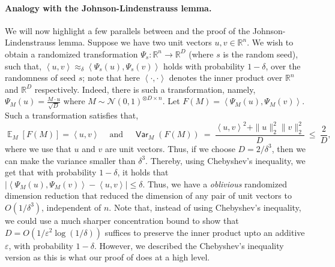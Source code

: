 \documentclass[11pt]{article}
\newcommand{\inparen}[1]{\left ( #1 \right )}
\newcommand{\inangle}[1]{\left \langle #1 \right \rangle}
\DeclareMathOperator*{\Ex}{\mathbb{E}}
\DeclareMathOperator*{\Var}{\mathsf{Var}}
\newcommand{\sAND}{\ \mathrm{and} \ }
\newcommand{\eps}{\varepsilon}
\newcommand{\bbR}{{\mathbb R}}
\newcommand{\calN}{\mathcal{N}}
\begin{document}
\paragraph{Analogy with the Johnson-Lindenstrauss lemma.} We will now highlight a few parallels between  and the proof of the Johnson-Lindenstrauss lemma. Suppose we have two unit vectors $u, v \in \bbR^n$. We wish to obtain a randomized transformation $\Psi_s : \bbR^n \to \bbR^D$ (where $s$ is the random seed), such that, $\inangle{u,v} \approx_\delta \inangle{\Psi_s(u), \Psi_s(v)}$ holds with probability $1-\delta$, over the randomness of seed $s$; note that here $\inangle{\cdot, \cdot}$ denotes the inner product over $\bbR^n$ and $\bbR^D$ respectively. Indeed, there is such a transformation, namely, $\Psi_M(u) = \frac{M \cdot u}{\sqrt{D}}$ where $M \sim \calN(0,1)^{\otimes D \times n}$. Let $F(M) = \inangle{\Psi_M(u), \Psi_M(v)}$. Such a transformation satisfies that,
\[ \Ex_{M} [F(M)] = \inangle{u,v} \quad \sAND \quad \Var_M \inparen{F(M)} ~=~ \frac{\inangle{u,v}^2 + \|u\|_2^2 \|v\|_2^2}{D} ~\le~ \frac{2}{D},\]
where we use that $u$ and $v$ are unit vectors. Thus, if we choose $D = 2/\delta^3$, then we can make the variance smaller than $\delta^3$. Thereby, using Chebyshev's inequality, we get that with probability $1-\delta$, it holds that $|\inangle{\Psi_M(u), \Psi_M(v)} - \inangle{u,v}| \le \delta$. Thus, we have a {\em oblivious} randomized dimension reduction that reduced the dimension of any pair of unit vectors to $O(1/\delta^3)$, independent of $n$. Note that, instead of using Chebyshev's inequality, we could use a much sharper concentration bound to show that $D = O(1/\eps^2 \log (1/\delta))$ suffices to preserve the inner product upto an additive $\eps$, with probability $1-\delta$. However, we described the Chebyshev's inequality version as this is what our proof of  does at a high level.
\end{document}
